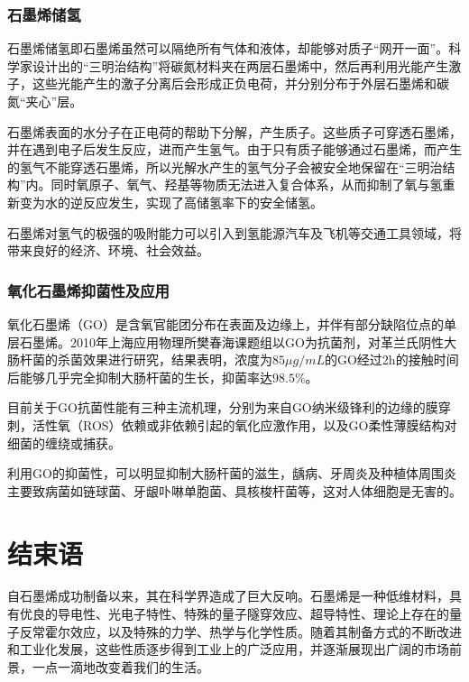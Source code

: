 \subsubsection{石墨烯储氢}
石墨烯储氢即石墨烯虽然可以隔绝所有气体和液体，却能够对质子“网开一面”。科学家设计出的“三明治结构”将碳氮材料夹在两层石墨烯中，然后再利用光能产生激子，这些光能产生的激子分离后会形成正负电荷，并分别分布于外层石墨烯和碳氮“夹心”层。\par
石墨烯表面的水分子在正电荷的帮助下分解，产生质子。这些质子可穿透石墨烯，并在遇到电子后发生反应，进而产生氢气。由于只有质子能够通过石墨烯，而产生的氢气不能穿透石墨烯，所以光解水产生的氢气分子会被安全地保留在“三明治结构”内。同时氧原子、氧气、羟基等物质无法进入复合体系，从而抑制了氧与氢重新变为水的逆反应发生，实现了高储氢率下的安全储氢。\par
石墨烯对氢气的极强的吸附能力可以引入到氢能源汽车及飞机等交通工具领域，将带来良好的经济、环境、社会效益。\par
\subsubsection{氧化石墨烯抑菌性及应用}
氧化石墨烯（GO）是含氧官能团分布在表面及边缘上，并伴有部分缺陷位点的单层石墨烯。2010年上海应用物理所樊春海课题组以GO为抗菌剂，对革兰氏阴性大肠杆菌的杀菌效果进行研究，结果表明，浓度为$85\mu g/mL$的GO经过2h的接触时间后能够几乎完全抑制大肠杆菌的生长，抑菌率达$98.5\%$。\cite{ref12}\par
目前关于GO抗菌性能有三种主流机理，分别为来自GO纳米级锋利的边缘的膜穿刺，活性氧（ROS）依赖或非依赖引起的氧化应激作用，以及GO柔性薄膜结构对细菌的缠绕或捕获。\par
利用GO的抑菌性，可以明显抑制大肠杆菌的滋生，龋病、牙周炎及种植体周围炎主要致病菌如链球菌、牙龈卟啉单胞菌、具核梭杆菌等，这对人体细胞是无害的。\par

\section{结束语}
自石墨烯成功制备以来，其在科学界造成了巨大反响。石墨烯是一种低维材料，具有优良的导电性、光电子特性、特殊的量子隧穿效应、超导特性、理论上存在的量子反常霍尔效应，以及特殊的力学、热学与化学性质。随着其制备方式的不断改进和工业化发展，这些性质逐步得到工业上的广泛应用，并逐渐展现出广阔的市场前景，一点一滴地改变着我们的生活。\par



